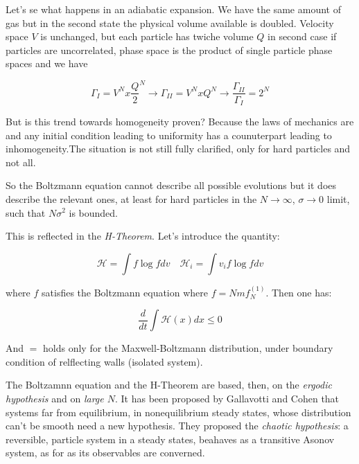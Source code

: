 \documentclass{article}
\begin{document}
Let's se what happens in an adiabatic expansion. We have the same amount of gas but in the second state the physical volume available is doubled. Velocity space $V$ is unchanged, but each particle has twiche volume $Q$ in second case if particles are uncorrelated, phase space is the product of single particle phase spaces and we have 

$$ \Gamma_{I} = V^N \textit{x} \frac{Q}{2}^N \rightarrow \Gamma_{II} = V^N \textit{x} Q^N \rightarrow \frac{\Gamma_{II}}{\Gamma_{I}} = 2^N $$

But is this trend towards homogeneity proven? Because the laws of mechanics are and any initial condition leading to uniformity has a counuterpart leading to inhomogeneity.The situation is not still fully clarified, only for hard particles and not all.

So the Boltzmann equation cannot describe all possible evolutions but it does describe the relevant ones, at least for hard particles in the $N \to \infty$, $\sigma \to 0$ limit, such that $N \sigma^2$ is bounded.

This is reflected in the \emph{H-Theorem}. Let's introduce the quantity:

$$ \mathcal{H} = \int f \log f dv \quad \mathcal{H}_i = \int v_i f \log f dv$$

where $f$ satisfies the Boltzmann equation where $f=Nmf_N^{(1)}$. Then one has:

$$\frac{d}{dt} \int \mathcal{H}(x)dx \leq 0$$

And $=$ holds only for the Maxwell-Boltzmann distribution, under boundary condition of relflecting walls (isolated system).

The Boltzamnn equation and the H-Theorem are based, then, on the \emph{ergodic hypothesis} and on \emph{large $N$}. It has been proposed by Gallavotti and Cohen that systems far from equilibrium, in nonequilibrium steady states, whose distribution can't be smooth need a new hypothesis. They proposed the \emph{chaotic hypothesis}: a reversible, particle system in a steady states, beahaves as a transitive Asonov system, as for as its observables are converned.
\end{document}
